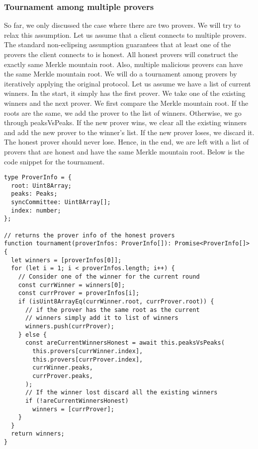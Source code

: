 \documentclass[a4paper,11pt,oneside]{article}
\theoremstyle{definition}
\begin{document}
    \subsubsection{Tournament among multiple provers}
    So far, we only discussed the case where there are two provers. We will try to relax this assumption. Let us assume that a client connects to multiple provers. The standard non-eclipsing assumption guarantees that at least one of the provers the client connects to is honest. All honest provers will construct the exactly same Merkle mountain root. Also, multiple malicious provers can have the same Merkle mountain root. We will do a tournament among provers by iteratively applying the original protocol. Let us assume we have a list of current winners. In the start, it simply has the first prover. We take one of the existing winners and the next prover. We first compare the Merkle mountain root. If the roots are the same, we add the prover to the list of winners. Otherwise, we go through peaksVsPeaks. If the new prover wins, we clear all the existing winners and add the new prover to the winner's list. If the new prover loses, we discard it. The honest prover should never lose. Hence, in the end, we are left with a list of provers that are honest and have the same Merkle mountain root. Below is the code snippet for the tournament. 
    
    \begin{lstlisting}
type ProverInfo = {
  root: Uint8Array;
  peaks: Peaks;
  syncCommittee: Uint8Array[];
  index: number;
};

// returns the prover info of the honest provers
function tournament(proverInfos: ProverInfo[]): Promise<ProverInfo[]> {
  let winners = [proverInfos[0]];
  for (let i = 1; i < proverInfos.length; i++) {
    // Consider one of the winner for the current round
    const currWinner = winners[0];
    const currProver = proverInfos[i];
    if (isUint8ArrayEq(currWinner.root, currProver.root)) {
      // if the prover has the same root as the current
      // winners simply add it to list of winners
      winners.push(currProver);
    } else {
      const areCurrentWinnersHonest = await this.peaksVsPeaks(
        this.provers[currWinner.index],
        this.provers[currProver.index],
        currWinner.peaks,
        currProver.peaks,
      );
      // If the winner lost discard all the existing winners
      if (!areCurrentWinnersHonest) 
        winners = [currProver];
    }
  }
  return winners;
}
    \end{lstlisting}
\end{document}
